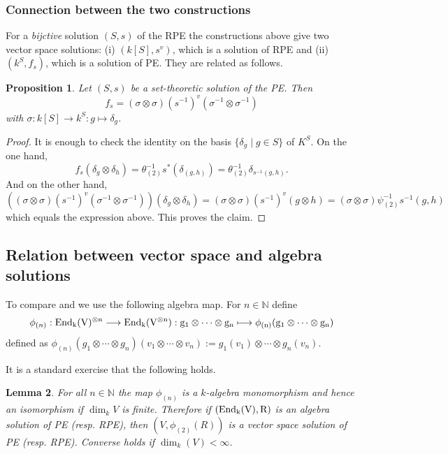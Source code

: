 \documentclass[a4paper,10pt]{amsart}
\newtheorem{lemma}{Lemma}[section]
\newtheorem{proposition}[lemma]{Proposition}
\theoremstyle{definition}
\theoremstyle{remark}
\newcommand\End{\rm End}
\newcommand\ot{\otimes}
\newcommand{\N}{{\mathbb N}}
\begin{document}
\subsubsection{Connection between the two constructions}

For a \emph{bijctive} solution $(S,s)$ of the RPE the constructions above give two vector space solutions:  (i) $(k[S],s^v)$, which is a solution of RPE and (ii) $(k^S,f_s)$, which is a solution of PE. They are related as follows.

\begin{proposition}\label{connection linear and pullback sol}
Let $(S,s)$ be a set-theoretic solution of the PE. Then 
$$f_s = (\sigma \ot \sigma)(s^{-1})^{v} (\sigma^{-1} \ot \sigma^{-1})$$ with $\sigma : k[S] \rightarrow k^S : g \mapsto \delta_g$.
\end{proposition}
\begin{proof}
It is enough to check the identity on the basis $\{\delta_g \mid g \in S\}$ of $K^S$.
On the one hand,
$$f_s(\delta_g \ot \delta_h) = \theta^{-1}_{(2)}s^* (\delta_{(g,h)}) = \theta^{-1}_{(2)} \delta_{s^{-1}(g,h)}.$$
And on the other hand,
$$\left( (\sigma \ot \sigma)(s^{-1})^{v} (\sigma^{-1} \ot \sigma^{-1}) \right) (\delta_g \ot \delta_h) = (\sigma \ot \sigma) (s^{-1})^v (g\ot h) = (\sigma \ot \sigma) \psi^{-1}_{(2)}s^{-1}(g,h)$$
which equals the expression above. This proves the claim.
\end{proof}


\subsection{Relation between vector space and algebra solutions}

To compare  and  we use the following algebra map. For $n \in \mathbb{N}$ define
$$\phi_{(n)}: \End_k(V)^{\ot n} \longrightarrow \End_k(V^{\ot n}): g_1 \otimes \cdots \ot g_n \longmapsto \phi_{(n)}(g_1 \otimes \cdots \ot g_n)$$
defined as $\phi_{(n)}(g_1 \otimes \cdots \ot g_n)(v_1 \ot \cdots \ot v_n) := g_1(v_1) \ot \cdots \ot g_n(v_n)$.

It is a standard exercise that the following holds.

\begin{lemma}
  For all $n\in \N$ the map $\phi_{(n)}$ is a $k$-algebra monomorphism and hence an isomorphism if $\dim_k V$ is finite. Therefore if $(\End_k(V),R)$ is an algebra solution of PE (resp. RPE), then $(V,\phi_{(2)}(R))$ is a vector space solution of PE (resp. RPE). Converse holds if $\dim_k(V) < \infty.$
\end{lemma}
\end{document}
